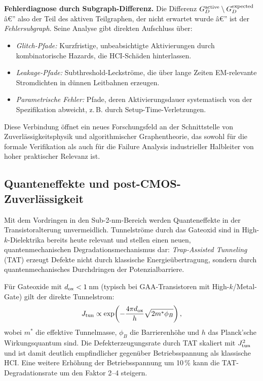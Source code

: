 ﻿\documentclass[a4paper,12pt]{article}
\theoremstyle{definition}
\begin{document}
\textbf{Fehlerdiagnose durch Subgraph-Differenz.}
Die Differenz $G_D^{\rm active} \setminus G_D^{\rm expected}$ â€” also der Teil
des aktiven Teilgraphen, der nicht erwartet wurde â€” ist der \emph{Fehlersubgraph}.
Seine Analyse gibt direkten Aufschluss über:
\begin{itemize}
	\item \emph{Glitch-Pfade:} Kurzfristige, unbeabsichtigte Aktivierungen durch
	      kombinatorische Hazards, die HCI-Schäden hinterlassen.
	\item \emph{Leakage-Pfade:} Subthreshold-Leckströme, die über lange Zeiten
	      EM-relevante Stromdichten in dünnen Leitbahnen erzeugen.
	\item \emph{Parametrische Fehler:} Pfade, deren Aktivierungsdauer systematisch
	      von der Spezifikation abweicht, z.\,B. durch Setup-Time-Verletzungen.
\end{itemize}

Diese Verbindung öffnet ein neues Forschungsfeld an der Schnittstelle von
Zuverlässigkeitsphysik und algorithmischer Graphentheorie, das sowohl für die
formale Verifikation als auch für die Failure Analysis industrieller Halbleiter
von hoher praktischer Relevanz ist.

\subsection{Quanteneffekte und post-CMOS-Zuverlässigkeit}
\label{sub:quantum}

Mit dem Vordringen in den Sub-2-nm-Bereich werden Quanteneffekte in der
Transistoralterung unvermeidlich. Tunnelströme durch das Gateoxid sind in
High-$k$-Dielektrika bereits heute relevant und stellen einen neuen,
quantenmechanischen Degradationsmechanismus dar: \emph{Trap-Assisted Tunneling}
(TAT) erzeugt Defekte nicht durch klassische Energieübertragung, sondern durch
quantenmechanisches Durchdringen der Potenzialbarriere.

Für Gateoxide mit $d_{\rm ox} < 1$\,nm (typisch bei GAA-Transistoren mit
High-$k$/Metal-Gate) gilt der direkte Tunnelstrom:
\[
J_{\rm tun} \propto \exp\!\left(-\frac{4\pi d_{\rm ox}}{h} \sqrt{2 m^* \phi_B}\right),
\]
wobei $m^*$ die effektive Tunnelmasse, $\phi_B$ die Barrierenhöhe und $h$ das
Planck'sche Wirkungsquantum sind. Die Defekterzeugungsrate durch TAT skaliert
mit $J_{\rm tun}^2$ und ist damit deutlich empfindlicher gegenüber
Betriebsspannung als klassische HCI. Eine weitere Erhöhung der Betriebsspannung
um 10\,\% kann die TAT-Degradationsrate um den Faktor 2--4 steigern.
\end{document}
